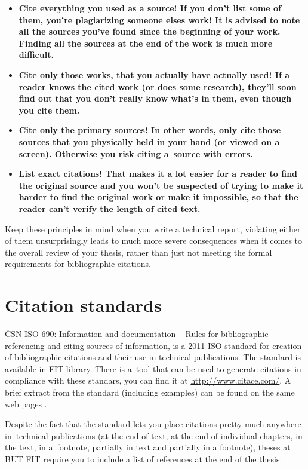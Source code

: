 \begin{itemize}
  \item{\bf Cite everything you used as a source! \rm If you don't list some of them, you're plagiarizing someone elses work! It is advised to note all the sources you've found since the beginning of your work. Finding all the sources at the end of the work is much more difficult.}
  \item{\bf Cite only those works, that you actually have actually used! \rm If a reader knows the cited work (or does some research), they'll soon find out that you don't really know what's in them, even though you cite them.}
  \item{\bf Cite only the primary sources! \rm In other words, only cite those sources that you physically held in your hand (or viewed on a screen). Otherwise you risk citing a~source with errors.}
  \item{\bf List exact citations! \rm That makes it a lot easier for a reader to find the original source and you won't be suspected of trying to make it harder to find the original work or make it impossible, so that the reader can't verify the length of cited text.} 
\end{itemize}

Keep these principles in mind when you write a technical report, violating either of them unsurprisingly leads to much more severe consequences when it comes to the overall review of your thesis, rather than just not meeting the formal requirements for bibliographic citations.

\section{Citation standards}

ČSN ISO 690: Information and documentation -- Rules for bibliographic referencing and citing sources of information, is a 2011 ISO standard for creation of bibliographic citations and their use in technical publications. The standard is available in FIT library. There is a~tool that can be used to generate citations in compliance with these standars, you can find it at \url{http://www.citace.com/}. A brief extract from the standard (including examples) can be found on the same web pages \cite{biblio}.

Despite the fact that the standard lets you place citations pretty much anywhere in~technical publications (at the end of text, at the end of individual chapters, in the text, in a~footnote, partially in text and partially in a footnote), theses at BUT FIT require you to include a list of references at the end of the thesis.

